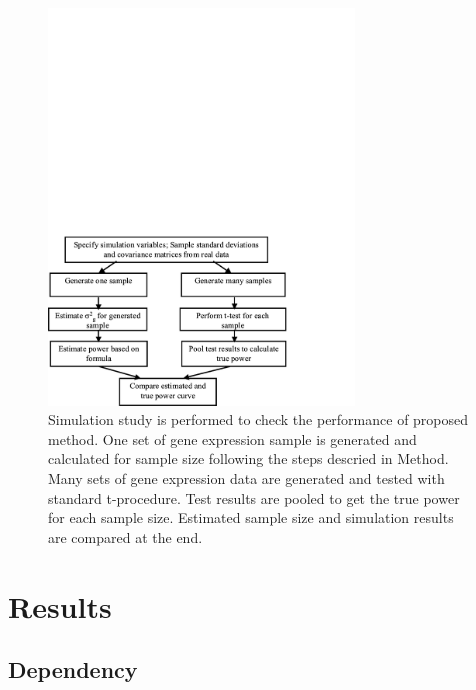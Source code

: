 \documentclass{bioinfo}
\begin{document}
\begin{figure}[h]
  \centerline{\includegraphics*[width=3.2in]{SimuFC.pdf}}
  \caption[Flow Chart for Simulation Study]
  {Simulation study is performed to check the performance of proposed method.
    One set of gene expression sample is generated and calculated for sample size following the steps descried in Method. Many sets of gene expression data are generated and
    tested with standard t-procedure. Test results are pooled to get the true power for
    each sample size. Estimated sample size and simulation results are compared at the end.}
  \label{fig:SimuFC}
\end{figure}

\section{Results}

\subsection{Dependency}
\end{document}
